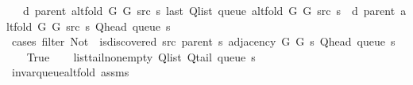 \begin{isabellebody}
\ \ \ {\isachardoublequoteopen}d\ {\isacharparenleft}{\kern0pt}parent\ {\isacharparenleft}{\kern0pt}alt{\isacharunderscore}{\kern0pt}fold\ G{}\ G{}\ src\ s{\isacharparenright}{\kern0pt}{\isacharparenright}{\kern0pt}\ {\isacharparenleft}{\kern0pt}last\ {\isacharparenleft}{\kern0pt}Q{\isacharunderscore}{\kern0pt}list\ {\isacharparenleft}{\kern0pt}queue\ {\isacharparenleft}{\kern0pt}alt{\isacharunderscore}{\kern0pt}fold\ G{}\ G{}\ src\ s{\isacharparenright}{\kern0pt}{\isacharparenright}{\kern0pt}{\isacharparenright}{\kern0pt}{\isacharparenright}{\kern0pt}\ {\isasymle}\ d\ {\isacharparenleft}{\kern0pt}parent\ {\isacharparenleft}{\kern0pt}alt{\isacharunderscore}{\kern0pt}fold\ G{}\ G{}\ src\ s{\isacharparenright}{\kern0pt}{\isacharparenright}{\kern0pt}\ {\isacharparenleft}{\kern0pt}Q{\isacharunderscore}{\kern0pt}head\ {\isacharparenleft}{\kern0pt}queue\ s{\isacharparenright}{\kern0pt}{\isacharparenright}{\kern0pt}\ {\isacharplus}{\kern0pt}\ {}{\isachardoublequoteclose}%
\endisataginvisible
{\isafoldinvisible}%
%
\isadeliminvisible
\isanewline
%
\endisadeliminvisible
%
\isadelimproof
%
\endisadelimproof
%
\isatagproof
{}\isamarkupfalse%
\ {\isacharparenleft}{\kern0pt}cases\ {\isachardoublequoteopen}filter\ {\isacharparenleft}{\kern0pt}Not\ {\isasymcirc}\ is{\isacharunderscore}{\kern0pt}discovered\ src\ {\isacharparenleft}{\kern0pt}parent\ s{\isacharparenright}{\kern0pt}{\isacharparenright}{\kern0pt}\ {\isacharparenleft}{\kern0pt}adjacency\ G{}\ G{}\ s\ {\isacharparenleft}{\kern0pt}Q{\isacharunderscore}{\kern0pt}head\ {\isacharparenleft}{\kern0pt}queue\ s{\isacharparenright}{\kern0pt}{\isacharparenright}{\kern0pt}{\isacharparenright}{\kern0pt}\ {\isacharequal}{\kern0pt}\ {\isacharbrackleft}{\kern0pt}{\isacharbrackright}{\kern0pt}{\isachardoublequoteclose}{\isacharparenright}{\kern0pt}\isanewline
\ \ \isamarkupfalse%
\ True\isanewline
\ \ \isamarkupfalse%
\ list{\isacharunderscore}{\kern0pt}tail{\isacharunderscore}{\kern0pt}non{\isacharunderscore}{\kern0pt}empty{\isacharcolon}{\kern0pt}\ {\isachardoublequoteopen}Q{\isacharunderscore}{\kern0pt}list\ {\isacharparenleft}{\kern0pt}Q{\isacharunderscore}{\kern0pt}tail\ {\isacharparenleft}{\kern0pt}queue\ s{\isacharparenright}{\kern0pt}{\isacharparenright}{\kern0pt}\ {\isasymnoteq}\ {\isacharbrackleft}{\kern0pt}{\isacharbrackright}{\kern0pt}{\isachardoublequoteclose}\isanewline
\ \ \ \ \isamarkupfalse%
\ invar{\isacharunderscore}{\kern0pt}queue{\isacharunderscore}{\kern0pt}alt{\isacharunderscore}{\kern0pt}fold\ assms\isanewline

\end{isabellebody}
